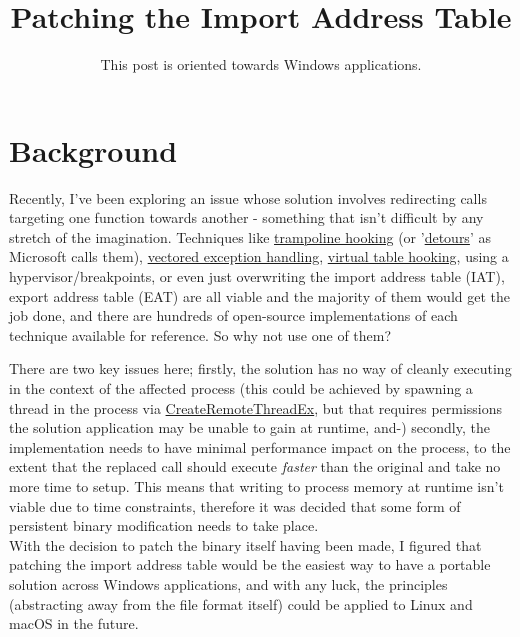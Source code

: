 \title{Patching the Import Address Table}
\subtitle{This post is oriented towards Windows applications.}

\section{Background}

Recently, I've been exploring an issue whose solution involves redirecting calls targeting one function towards another - something that isn't difficult by any
			stretch of the imagination. Techniques like \href{https://malwaretech.com/2015/01/inline-hooking-for-programmers-part-1.html}{trampoline hooking} (or
			'\href{https://www.microsoft.com/en-us/research/project/detours/}{detours}' as Microsoft calls them),
			\href{https://mark.rxmsolutions.com/hook-via-vectored-exception-handling/}{vectored exception handling},
			\href{https://dimitrifourny.github.io/2014/07/02/vtable-hooking.html}{virtual table hooking}, using a hypervisor/breakpoints,
			or even just overwriting the import address table (IAT), export address table (EAT) are all viable and the majority of them would get the job done, and there
			are hundreds of open-source implementations of each technique available for reference. So why not use one of them?

There are two key issues here; firstly, the solution has no way of cleanly executing in the context of the affected process
			(this could be achieved by spawning a thread in the process via \href{https://learn.microsoft.com/en-us/windows/win32/api/processthreadsapi/nf-processthreadsapi-createremotethreadex}{CreateRemoteThreadEx},
			but that requires permissions the solution application may be unable to gain at runtime, and-) secondly, the implementation needs to have minimal performance
			impact on the process, to the extent that the replaced call should execute \textit{faster} than the original and take no more time to setup.
			This means that writing to process memory at runtime isn't viable due to time constraints, therefore it was decided that some form of persistent binary modification needs to take place.
			\\

			With the decision to patch the binary itself having been made, I figured that patching the import address table would be the easiest way to have a portable solution
			across Windows applications, and with any luck, the principles (abstracting away from the file format itself) could be applied to Linux and macOS in the future.

